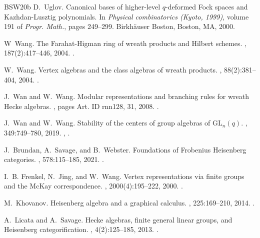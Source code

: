 \documentclass[12pt]{amsart}
\numberwithin{itemcounter}{subsection}
\theoremstyle{plain}
\theoremstyle{definition}
\theoremstyle{remark}
\numberwithin{equation}{section}
\begin{document}
\begin{thebibliography}{BSW20b}
D.~Uglov.
\newblock Canonical bases of higher-level {$q$}-deformed {F}ock spaces and
  {K}azhdan-{L}usztig polynomials.
\newblock In {\em Physical combinatorics ({K}yoto, 1999)}, volume 191 of {\em
  Progr. Math.}, pages 249--299. Birkh\"auser Boston, Boston, MA, 2000.

W~Wang.
\newblock The {F}arahat-{H}igman ring of wreath products and {H}ilbert schemes.
, 187(2):417--446, 2004.
\newblock \href {https://doi.org/10.1016/j.aim.2003.09.003}
  {}.

W.~Wang.
\newblock Vertex algebras and the class algebras of wreath products.
, 88(2):381--404, 2004.
\newblock \href {https://doi.org/10.1112/S0024611503014382}
  {}.

J.~Wan and W.~Wang.
\newblock Modular representations and branching rules for wreath {H}ecke
  algebras.
, pages Art. ID rnn128, 31, 2008.
\newblock \href {https://doi.org/10.1093/imrn/rnn128}
  {}.

J.~Wan and W.~Wang.
\newblock Stability of the centers of group algebras of $\mathrm{GL}_n(q)$.
, 349:749--780, 2019.
\newblock \href {https://arxiv.org/abs/1805.08796} {},
  \href {https://doi.org/10.1016/j.aim.2019.04.016}
  {}.

J.~Brundan, A.~Savage, and B.~Webster.
\newblock Foundations of Frobenius {H}eisenberg categories.
, 578:115--185, 2021.
\newblock \href{https://doi.org/10.1016/j.jalgebra.2021.02.025}
  {}.

I.~B. Frenkel, N.~Jing, and W.~Wang.
\newblock Vertex representations via finite groups and the {M}c{K}ay correspondence.
, 2000(4):195--222, 2000.
\newblock \href{https://doi.org/10.1155/S107379280000012X}
  {}.

M.~Khovanov.
\newblock Heisenberg algebra and a graphical calculus.
, 225:169--210, 2014.
\newblock \href{https://doi.org/10.4064/fm225-1-8}
  {}.

A.~Licata and A.~Savage.
\newblock Hecke algebras, finite general linear groups, and {H}eisenberg categorification.
, 4(2):125--185, 2013.
\newblock \href{https://doi.org/10.4171/QT/37}
  {}.


\end{thebibliography}
\end{document}
